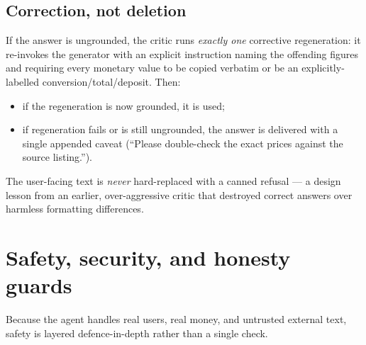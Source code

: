 \documentclass[11pt,a4paper]{article}
\begin{document}
\subsection{Correction, not deletion}
If the answer is ungrounded, the critic runs \emph{exactly one} corrective
regeneration: it re-invokes the generator with an explicit instruction naming the
offending figures and requiring every monetary value to be copied verbatim or be an
explicitly-labelled conversion/total/deposit. Then:
\begin{itemize}[leftmargin=1.4em,itemsep=1pt]
  \item if the regeneration is now grounded, it is used;
  \item if regeneration fails or is still ungrounded, the answer is delivered with a
        single appended caveat (``Please double-check the exact prices against the
        source listing.'').
\end{itemize}
The user-facing text is \emph{never} hard-replaced with a canned refusal --- a
design lesson from an earlier, over-aggressive critic that destroyed correct answers
over harmless formatting differences.

\section{Safety, security, and honesty guards}
\label{sec:safety}

Because the agent handles real users, real money, and untrusted external text, safety
is layered defence-in-depth rather than a single check.
\end{document}
